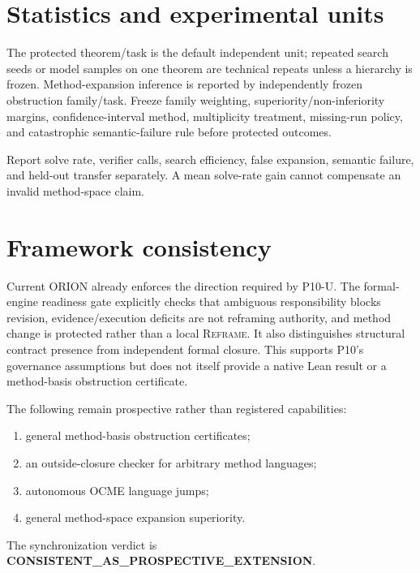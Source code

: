 \documentclass[11pt]{article}
\begin{document}
\section{Statistics and experimental units}
The protected theorem/task is the default independent unit; repeated search seeds or model samples on one theorem are technical repeats unless a hierarchy is frozen. Method-expansion inference is reported by independently frozen obstruction family/task. Freeze family weighting, superiority/non-inferiority margins, confidence-interval method, multiplicity treatment, missing-run policy, and catastrophic semantic-failure rule before protected outcomes.

Report solve rate, verifier calls, search efficiency, false expansion, semantic failure, and held-out transfer separately. A mean solve-rate gain cannot compensate an invalid method-space claim.

\section{Framework consistency}
Current ORION already enforces the direction required by P10-U. The formal-engine readiness gate explicitly checks that ambiguous responsibility blocks revision, evidence/execution deficits are not reframing authority, and method change is protected rather than a local \textsc{Reframe}. It also distinguishes structural contract presence from independent formal closure. This supports P10's governance assumptions but does not itself provide a native Lean result or a method-basis obstruction certificate.

The following remain prospective rather than registered capabilities:
\begin{enumerate}
    \item general method-basis obstruction certificates;
    \item an outside-closure checker for arbitrary method languages;
    \item autonomous OCME language jumps;
    \item general method-space expansion superiority.
\end{enumerate}
The synchronization verdict is \textbf{CONSISTENT\_AS\_PROSPECTIVE\_EXTENSION}.
\end{document}
